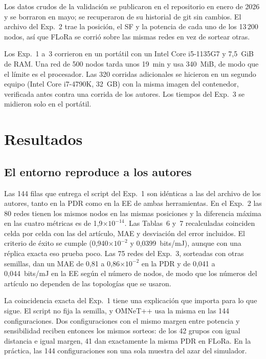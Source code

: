 \documentclass[conference,a4paper]{IEEEtran}
\begin{document}
Los datos crudos de la validación se publicaron en el repositorio en enero de 2026 y se borraron en mayo; se recuperaron de su historial de git sin cambios. El archivo del Exp.~2 trae la posición, el SF y la potencia de cada uno de los 13\,200 nodos, así que FLoRa se corrió sobre las mismas redes en vez de sortear otras.

Los Exp.~1 a~3 corrieron en un portátil con un Intel Core i5-1135G7 y 7,5~GiB de RAM. Una red de 500 nodos tarda unos 19~min y usa 340~MiB, de modo que el límite es el procesador. Las 320 corridas adicionales se hicieron en un segundo equipo (Intel Core i7-4790K, 32~GB) con la misma imagen del contenedor, verificada antes contra una corrida de los autores. Los tiempos del Exp.~3 se midieron solo en el portátil.

\section{Resultados}

\subsection{El entorno reproduce a los autores}

Las 144 filas que entrega el script del Exp.~1 son idénticas a las del archivo de los autores, tanto en la PDR como en la EE de ambas herramientas. En el Exp.~2 las 80 redes tienen los mismos nodos en las mismas posiciones y la diferencia máxima en las cuatro métricas es de 1,9$\times10^{-14}$. Las Tablas~6 y~7 recalculadas coinciden celda por celda con las del artículo, MAE y desviación del error incluidos. El criterio de éxito se cumple (0,940$\times10^{-2}$ y 0,0399~bits/mJ), aunque con una réplica exacta eso prueba poco. Las 75 redes del Exp.~3, sorteadas con otras semillas, dan un MAE de 0,81 a 0,86$\times10^{-2}$ en la PDR y de 0,041 a 0,044~bits/mJ en la EE según el número de nodos, de modo que los números del artículo no dependen de las topologías que se usaron.

La coincidencia exacta del Exp.~1 tiene una explicación que importa para lo que sigue. El script no fija la semilla, y OMNeT++ usa la misma en las 144 configuraciones. Dos configuraciones con el mismo margen entre potencia y sensibilidad reciben entonces los mismos sorteos: de los 42 grupos con igual distancia e igual margen, 41 dan exactamente la misma PDR en FLoRa. En la práctica, las 144 configuraciones son una sola muestra del azar del simulador.
\end{document}
